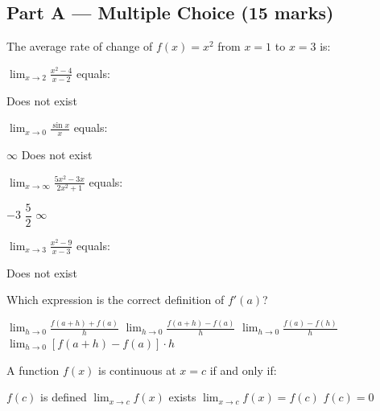 \documentclass[addpoints]{exam}
\begin{document}
\newpage
\begin{questions}

\section*{Part A --- Multiple Choice (15 marks)}
\vspace{5mm}

\question[1] The average rate of change of $f(x) = x^2$ from $x = 1$ to $x = 3$ is:
\begin{choices}
\end{choices}

\question[1] $\displaystyle\lim_{x \to 2} \frac{x^2 - 4}{x - 2}$ equals:
\begin{choices}
    \choice Does not exist
\end{choices}

\question[1] $\displaystyle\lim_{x \to 0} \frac{\sin x}{x}$ equals:
\begin{choices}
    \choice $\infty$
    \choice Does not exist
\end{choices}

\question[1] $\displaystyle\lim_{x \to \infty} \frac{5x^2 - 3x}{2x^2 + 1}$ equals:
\begin{choices}
    \choice $-3$
    \correctchoice $\dfrac{5}{2}$
    \choice $\infty$
\end{choices}

\question[1] $\displaystyle\lim_{x \to 3} \frac{x^2 - 9}{x - 3}$ equals:
\begin{choices}
    \choice Does not exist
\end{choices}

\question[1] Which expression is the correct definition of $f'(a)$?
\begin{choices}
    \choice $\displaystyle\lim_{h \to 0} \frac{f(a+h) + f(a)}{h}$
    \correctchoice $\displaystyle\lim_{h \to 0} \frac{f(a+h) - f(a)}{h}$
    \choice $\displaystyle\lim_{h \to 0} \frac{f(a) - f(h)}{h}$
    \choice $\displaystyle\lim_{h \to 0} \left[f(a+h) - f(a)\right] \cdot h$
\end{choices}

\question[1] A function $f(x)$ is continuous at $x = c$ if and only if:
\begin{choices}
    \choice $f(c)$ is defined
    \choice $\displaystyle\lim_{x \to c} f(x)$ exists
    \correctchoice $\displaystyle\lim_{x \to c} f(x) = f(c)$
    \choice $f(c) = 0$
\end{choices}


\end{questions}
\end{document}
